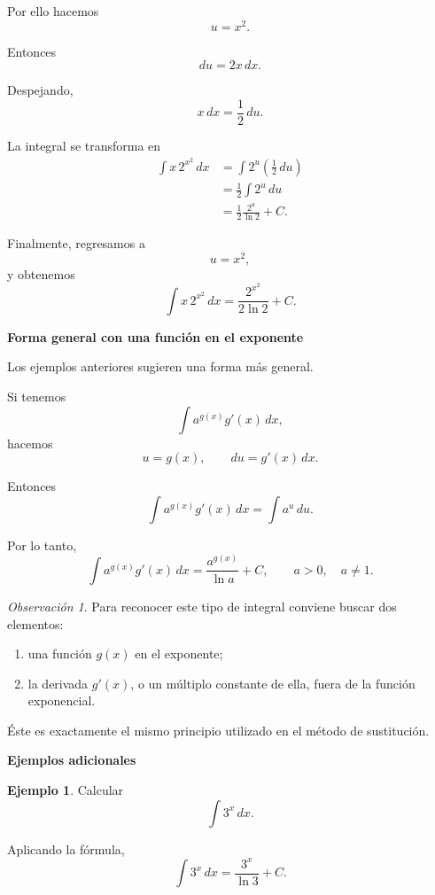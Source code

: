 \documentclass[12pt]{article}
\theoremstyle{definition}
\newtheorem{ejemplo}[teorema]{Ejemplo}
\theoremstyle{remark}
\newtheorem*{observacion}{Observación}
\begin{document}
Por ello hacemos
\[
u=x^2.
\]

Entonces
\[
du=2x\,dx.
\]

Despejando,
\[
x\,dx=\frac{1}{2}\,du.
\]

La integral se transforma en
\[
\begin{aligned}
\int x\,2^{x^2}\,dx
&=
\int 2^u\left(\frac{1}{2}\,du\right)
\\[0.3cm]
&=
\frac{1}{2}\int 2^u\,du
\\[0.3cm]
&=
\frac{1}{2}
\frac{2^u}{\ln 2}+C.
\end{aligned}
\]

Finalmente, regresamos a
\[
u=x^2,
\]
y obtenemos
\[
\boxed{
\int x\,2^{x^2}\,dx
=
\frac{2^{x^2}}{2\ln 2}+C
}.
\]

\textbf{Forma general con una función en el exponente}

Los ejemplos anteriores sugieren una forma más general.

Si tenemos
\[
\int a^{g(x)}g'(x)\,dx,
\]
hacemos
\[
u=g(x),
\qquad
du=g'(x)\,dx.
\]

Entonces
\[
\int a^{g(x)}g'(x)\,dx
=
\int a^u\,du.
\]

Por lo tanto,
\[
\boxed{
\int a^{g(x)}g'(x)\,dx
=
\frac{a^{g(x)}}{\ln a}+C
},
\qquad
a>0,\quad a\neq1.
\]

\begin{observacion}
Para reconocer este tipo de integral conviene buscar dos elementos:

\begin{enumerate}
    \item una función \(g(x)\) en el exponente;
    \item la derivada \(g'(x)\), o un múltiplo constante de ella,
    fuera de la función exponencial.
\end{enumerate}

Éste es exactamente el mismo principio utilizado en el método de
sustitución.
\end{observacion}

\textbf{Ejemplos adicionales}

\begin{ejemplo}
Calcular
\[
\int 3^x\,dx.
\]

Aplicando la fórmula,
\[
\boxed{
\int 3^x\,dx
=
\frac{3^x}{\ln 3}+C
}.
\]
\end{ejemplo}
\end{document}
